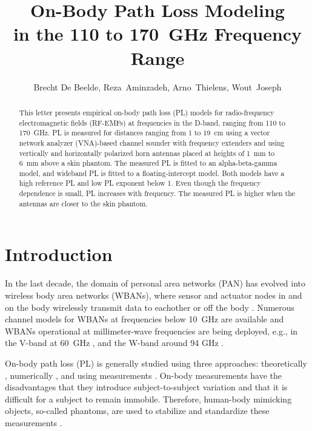 \documentclass[preprint]{rsl}
\title{On-Body Path Loss Modeling\\ in the 110 to 170~GHz Frequency Range}
\author{Brecht De Beelde,
Reza~Aminzadeh,
Arno~Thielens,
Wout~Joseph
}
\begin{document}
\maketitle

%
%

\begin{abstract}
This letter presents empirical on-body path loss (PL) models for radio-frequency electromagnetic fields (RF-EMFs) at frequencies in the D-band, ranging from 110 to 170~GHz. 
PL is measured for distances ranging from 1 to 19~cm using a vector network analyzer (VNA)-based channel sounder with frequency extenders and using vertically and horizontally polarized horn antennas placed at heights of 1~mm to 6~mm above a skin phantom.
The measured PL is fitted to an alpha-beta-gamma model, and wideband PL is fitted to a floating-intercept model.
Both models have a high reference PL and low PL exponent below 1. 
Even though the frequency dependence is small, PL increases with frequency. 
The measured PL is higher when the antennas are closer to the skin phantom.
\end{abstract}

\section{Introduction\label{sect:intro}}

In the last decade, the domain of personal area networks (PAN) has evolved into wireless body area networks (WBANs), where sensor and actuator nodes in and on the body  wirelessly transmit data to eachother \cite{Patel2010} or off the body \cite{Marinova2015}. 
Numerous channel models for WBANs at frequencies below 10~GHz are available \cite{VanRoy2010} and WBANs operational at millimeter-wave frequencies are being deployed, e.g., in the V-band at 60~GHz \cite{Chahat2013,Petrillo2014,Aminzadeh2021_tap}, and the W-band around 94 GHz \cite{Brizzi2013,Ali2022}.

On-body path loss (PL) is generally studied using three approaches: theoretically \cite{Chahat2013,Petrillo2014}, numerically \cite{Reusens2009}, and using measurements \cite{Chahat2013,Reusens2009,Aminzadeh2021_tap}. 
On-body measurements have the disadvantages that they introduce subject-to-subject variation \cite{Proesmans2022} and that it is difficult for a subject to remain immobile. 
Therefore, human-body mimicking objects, so-called phantoms, are used to stabilize and standardize these measurements \cite{Chahat2013}. 
\end{document}
